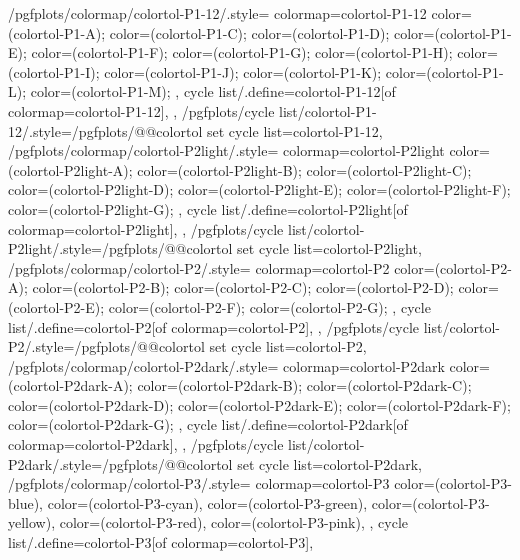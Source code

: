 {  %
  /pgfplots/colormap/colortol-P1-12/.style={
    colormap={colortol-P1-12}{
      color=(colortol-P1-A);
      color=(colortol-P1-C);
      color=(colortol-P1-D);
      color=(colortol-P1-E);
      color=(colortol-P1-F);
      color=(colortol-P1-G);
      color=(colortol-P1-H);
      color=(colortol-P1-I);
      color=(colortol-P1-J);
      color=(colortol-P1-K);
      color=(colortol-P1-L);
      color=(colortol-P1-M);
    },
    cycle list/.define={colortol-P1-12}{[of colormap=colortol-P1-12]},
  },
  /pgfplots/cycle list/colortol-P1-12/.style={/pgfplots/@@colortol set cycle list={colortol-P1-12}},
  /pgfplots/colormap/colortol-P2light/.style={
    colormap={colortol-P2light}{
      color=(colortol-P2light-A);
      color=(colortol-P2light-B);
      color=(colortol-P2light-C);
      color=(colortol-P2light-D);
      color=(colortol-P2light-E);
      color=(colortol-P2light-F);
      color=(colortol-P2light-G);
    },
    cycle list/.define={colortol-P2light}{[of colormap=colortol-P2light]},
  },
  /pgfplots/cycle list/colortol-P2light/.style={/pgfplots/@@colortol set cycle list={colortol-P2light}},
  /pgfplots/colormap/colortol-P2/.style={
    colormap={colortol-P2}{
      color=(colortol-P2-A);
      color=(colortol-P2-B);
      color=(colortol-P2-C);
      color=(colortol-P2-D);
      color=(colortol-P2-E);
      color=(colortol-P2-F);
      color=(colortol-P2-G);
    },
    cycle list/.define={colortol-P2}{[of colormap=colortol-P2]},
  },
  /pgfplots/cycle list/colortol-P2/.style={/pgfplots/@@colortol set cycle list={colortol-P2}},
  /pgfplots/colormap/colortol-P2dark/.style={
    colormap={colortol-P2dark}{
      color=(colortol-P2dark-A);
      color=(colortol-P2dark-B);
      color=(colortol-P2dark-C);
      color=(colortol-P2dark-D);
      color=(colortol-P2dark-E);
      color=(colortol-P2dark-F);
      color=(colortol-P2dark-G);
    },
    cycle list/.define={colortol-P2dark}{[of colormap=colortol-P2dark]},
  },
  /pgfplots/cycle list/colortol-P2dark/.style={/pgfplots/@@colortol set cycle list={colortol-P2dark}},
  /pgfplots/colormap/colortol-P3/.style={
    colormap={colortol-P3}{
      color=(colortol-P3-blue),
      color=(colortol-P3-cyan),
      color=(colortol-P3-green),
      color=(colortol-P3-yellow),
      color=(colortol-P3-red),
      color=(colortol-P3-pink),
    },
    cycle list/.define={colortol-P3}{[of colormap=colortol-P3]},
}}
